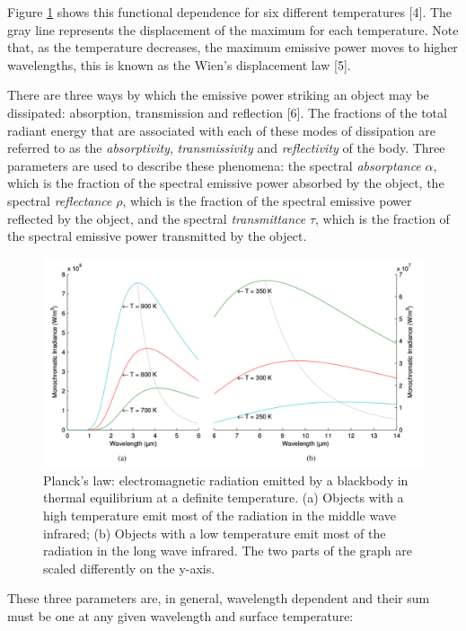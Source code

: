 		Figure \ref{fig1.3} shows this functional dependence for six different temperatures [4]. The gray line represents the displacement of the maximum for each temperature. Note that, as the temperature decreases, the maximum emissive power moves to higher wavelengths, this is known as the Wien's displacement law [5]. 
		
		There are three ways by which the emissive power striking an object may be dissipated: absorption, transmission and reflection [6]. The fractions of the total radiant energy that are associated with each of these modes of dissipation are referred to as the \textit{absorptivity}, \textit{transmissivity} and \textit{reflectivity} of the body. Three parameters are used to describe these phenomena: the spectral \textit{absorptance} $\alpha$, which is the fraction of the spectral emissive power absorbed by the object, the spectral \textit{reflectance} $\rho$, which is the fraction of the spectral emissive power reflected by the object, and the spectral \textit{transmittance} $\tau$, which is the fraction of the spectral emissive power transmitted by the object.
		
		\begin{figure}[ht!]
			\centering
			\captionsetup{justification=centering,margin=2cm}
			\includegraphics[scale=0.45]{Figures/Chapter01/PlankFunction.pdf}
			\caption{Planck's law: electromagnetic radiation emitted by a blackbody in thermal equilibrium at a definite  temperature. (a) Objects with a high temperature emit most of the radiation in the middle wave infrared; (b) Objects with a low temperature emit most of the radiation in the long wave infrared. The two parts of the graph are scaled differently on the y-axis.}\label{fig1.3}
		\end{figure}		
		
		These three parameters are, in general, wavelength dependent and their sum must be one at any given wavelength and surface temperature:
		

